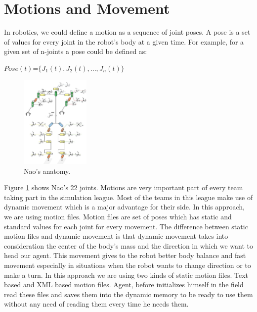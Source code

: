 \section{Motions and Movement}
In robotics, we could define a motion as a sequence of joint poses. A pose is a set of values for every joint in the robot's body at a given time.
For example, for a given set of n-joints a pose could be defined as:\\
\begin{center}
$Pose(t)$=$\lbrace J_{1}(t),J_{2}(t),...,J_{n}(t) \rbrace$\\
\end{center}
\begin{figure}[htb!]
\centering
  \includegraphics[width=0.3\textwidth]{Chapter3/figures/Models_NaoAnatomy.png}
  \caption{Nao's anatomy.}
  \label{fig:NaoAnatomy}
\end{figure}
Figure \ref{fig:NaoAnatomy} shows Nao's 22 joints.
Motions are very important part of every team taking part in the simulation league. Most of the teams in this league make use of dynamic movement which is a major advantage for their side. In this approach, we are using motion files. Motion files are set of poses which has static and standard values for each joint for every movement. The difference between static motion files and dynamic movement is that dynamic movement takes into consideration the center of the body's mass and the direction in which we want to head our agent. This movement gives to the robot better body balance and fast movement especially in situations when the robot wants to change direction or to make a turn. In this approach we are using two kinds of static motion files. Text based and XML based motion files. Agent, before initializes himself in the field read these files and saves them into the dynamic memory to be ready to use them without any need of reading them every time he needs them.




